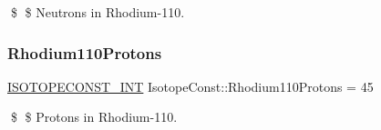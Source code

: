 \$ \$ Neutrons in Rhodium-\/110. \mbox{\label{group___isotope_const-_rhodium-_rh110_ga1d87e00c9d99240a7e277c7756ff5caa}} 
\subsubsection{\texorpdfstring{Rhodium110\+Protons}{Rhodium110Protons}}
{\footnotesize\ttfamily \mbox{\hyperlink{group___isotope_const-_macros_ga5f18360b3e99483a35c32d789e62621c}{I\+S\+O\+T\+O\+P\+E\+C\+O\+N\+S\+T\+\_\+\+I\+NT}} Isotope\+Const\+::\+Rhodium110\+Protons = 45}

\$ \$ Protons in Rhodium-\/110. 